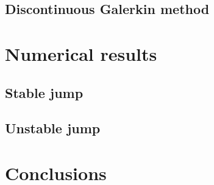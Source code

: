 \documentclass{article}
\begin{document}
\subsection{Discontinuous Galerkin method}

\section{Numerical results}

\subsection{Stable jump}

\subsection{Unstable jump}

\section{Conclusions}




\end{document}
